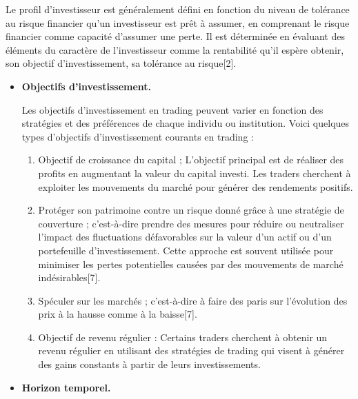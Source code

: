 { Le profil d'investisseur est généralement défini en fonction du niveau
de tolérance au risque financier qu'un investisseur est prêt à assumer,
en comprenant le risque financier comme capacité d'assumer une perte. Il
est déterminée en évaluant des éléments du caractère de l'investisseur
comme la rentabilité qu'il espère obtenir, son objectif
d'investissement, sa tolérance au risque{[}2{]}.}

\begin{itemize}
\item
  \textbf{Objectifs d'investissement.}

  { Les objectifs d'investissement en trading peuvent varier en fonction
  des stratégies et des préférences de chaque individu ou institution.
  Voici quelques types d'objectifs d'investissement courants en trading
  :}

  \begin{enumerate}
  \item
    Objectif de croissance du capital ; L'objectif principal est de
    réaliser des profits en augmentant la valeur du capital investi. Les
    traders cherchent à exploiter les mouvements du marché pour générer
    des rendements positifs.
  \item
    Protéger son patrimoine contre un risque donné grâce à une stratégie
    de couverture ; c'est-à-dire prendre des mesures pour réduire ou
    neutraliser l'impact des fluctuations défavorables sur la valeur
    d'un actif ou d'un portefeuille d'investissement. Cette approche est
    souvent utilisée pour minimiser les pertes potentielles causées par
    des mouvements de marché indésirables{[}7{]}.
  \item
    Spéculer sur les marchés ; c'est-à-dire à faire des paris sur
    l'évolution des prix à la hausse comme à la baisse{[}7{]}.
  \item
    Objectif de revenu régulier : Certains traders cherchent à obtenir
    un revenu régulier en utilisant des stratégies de trading qui visent
    à générer des gains constants à partir de leurs investissements.
  \end{enumerate}
\item
  \textbf{Horizon temporel.}


\end{itemize}
